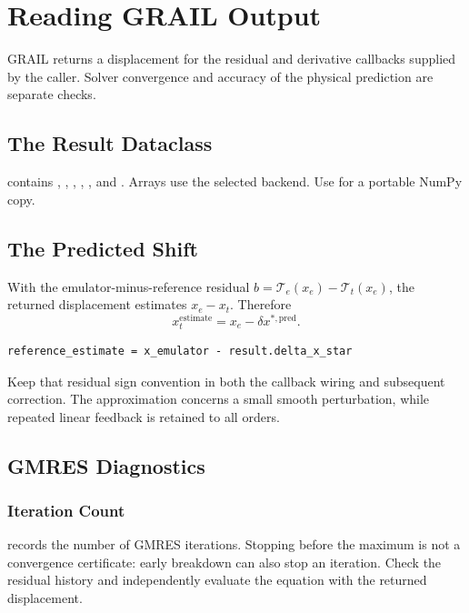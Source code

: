 \chapter{Reading GRAIL Output}
\label{ch:output}
GRAIL returns a displacement for the residual and derivative callbacks supplied
by the caller. Solver convergence and accuracy of the physical prediction are
separate checks.

\section{The Result Dataclass}
\label{sec:result-overview}
 contains ,
, ,
, , and
. Arrays use the selected backend.
Use  for a portable NumPy copy.

\section{The Predicted Shift}
\label{sec:delta-x-star}
With the emulator-minus-reference residual
$b=\mathcal T_e(x_e)-\mathcal T_t(x_e)$, the returned displacement
estimates $x_e-x_t$. Therefore
\begin{equation}
 x_t^{\mathrm{estimate}}=x_e-\delta x^{*,\mathrm{pred}}.
\end{equation}
\begin{lstlisting}[style=grailInStyle]
reference_estimate = x_emulator - result.delta_x_star
\end{lstlisting}
Keep that residual sign convention in both the callback wiring and subsequent
correction. The approximation concerns a small smooth perturbation, while
repeated linear feedback is retained to all orders.

\section{GMRES Diagnostics}
\label{sec:gmres-diag}
\subsection{Iteration Count}
\label{sec:iter-count}
 records the number of GMRES iterations. Stopping before
the maximum is not a convergence certificate: early breakdown can also stop an
iteration. Check the residual history and independently evaluate the equation
with the returned displacement.
